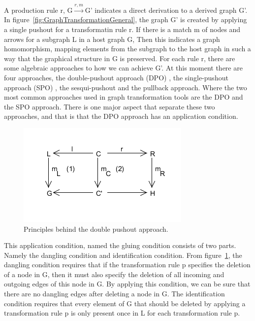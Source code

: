 A production rule r, \mbox{G$\xrightarrow{r,m}$G'} indicates a direct
derivation to a derived graph G'. In
figure~\ref{fig:GraphTransformationGeneral}, the graph G' is created by
applying a single pushout for a transformatin rule r. If there is a match m of
nodes and arrows for a subgraph L in a host graph G, Then this indicates a
graph homomorphism, mapping elements from the subgraph to the host graph in
such a way that the graphical structure in G is preserved. For each rule r,
there are some algebraic approaches to how we can achieve G'. At this moment
there are four approaches, the double-pushout approach (DPO) \cite{Loewe1997}, the
single-pushout approach (SPO) \cite{Ehrig1997}, the
sesqui-pushout\cite{Corradini2006} and the pullback approach\cite{Bauderon}.
Where the two most common approaches used in graph transformation tools are the
DPO and the SPO approach. There is one major aspect that separate these two
approaches, and that is that the DPO approach has an application condition.

\begin{figure}[H]
	\centering
	\includegraphics[scale=0.7]{./Figures/Double_Pushout.png}
	\caption[The Double Pushout approach]
	{Principles behind the double pushout approach.}
	\label{fig:DPO}
\end{figure}

\noindent This application condition, named the gluing condition\cite{Loewe1997}
consists of two parts. Namely the dangling condition and identification
condition. From figure~\ref{fig:DPO}, the dangling condition requires that if
the transformation rule p specifies the deletion of a node in G, then it must also
specify the deletion of all incoming and outgoing edges of this node in G. By
applying this condition, we can be sure that there are no dangling edges after
deleting a node in G. The identification condition requires that every element
of G that should be deleted by applying a transformation rule p is only present
once in L for each transformation rule p. 

